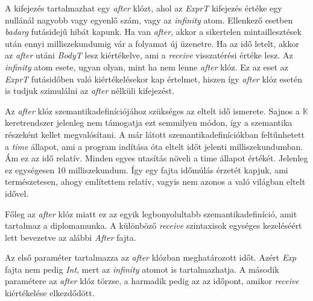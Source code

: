 

A kifejezés tartalmazhat egy \textit{after} klózt, ahol az \textit{ExprT} kifejezés értéke egy nullánál nagyobb vagy egyenlő szám, vagy az \textit{infinity} atom. Ellenkező esetben \textit{badarg} futásidejű hibát kapunk. Ha van \textit{after}, akkor a sikertelen mintaillesztések után ennyi milliszekundumig vár a folyamat új üzenetre. Ha az idő letelt, akkor az \textit{after} utáni \textit{BodyT} lesz kiértékelve, ami a \textit{receive} visszatérési értéke lesz. Az \textit{infinity} atom esete, ugyan olyan, mint ha nem lenne \textit{after} klóz. Ez az eset az \textit{ExprT} futásidőben való kiértékelésekor kap értelmet, hiszen így \textit{after} klóz esetén is tudjuk szimulálni az \textit{after} nélküli kifejezést.

Az \textit{after} klóz szemantikadefiníciójához szükséges az eltelt idő ismerete. Sajnos a $\mathbb{K}$ keretrendszer jelenleg nem támogatja ezt semmilyen módon, így a szemantika részeként kellet megvalósítani. A már látott szemantikadefiníciókban feltűnhetett a \textit{time} állapot, ami a program indítása óta eltelt időt jelenti milliszekundumban. Ám ez az idő relatív. Minden egyes utasítás növeli a time állapot értékét. Jelenleg ez egységesen 10 milliszekundum. Így egy fajta időmúlás érzetét kapjuk, ami természetesen, ahogy említettem relatív, vagyis nem azonos a való világban eltelt idővel.

Főleg az \textit{after} klóz miatt ez az egyik legbonyolultabb szemantikadefiníció, amit tartalmaz a diplomamunka. A különböző \textit{receive} szintaxisok egységes kezeléséért lett bevezetve az alábbi \textit{After} fajta.



Az első paraméter tartalmazza az \textit{after} klózban meghatározott időt. Azért \textit{Exp} fajta nem pedig \textit{Int}, mert az \textit{infinity} atomot is tartalmazhatja. A második paramétere az \textit{after} klóz törzse, a harmadik pedig az az időpont, amikor \textit{receive} kiértékelése elkezdődött.



